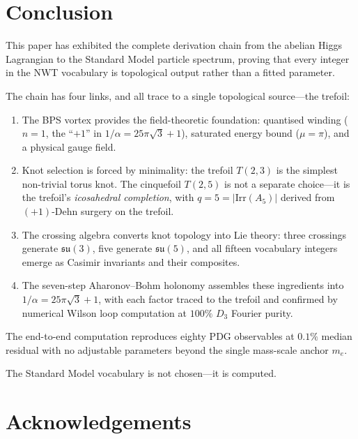 \documentclass[11pt]{article}
\newcommand{\su}{\mathfrak{su}}
\begin{document}
\section{Conclusion}
\label{sec:conclusion}

This paper has exhibited the complete derivation chain from the
abelian Higgs Lagrangian to the Standard Model particle spectrum,
proving that every integer in the NWT vocabulary is topological
output rather than a fitted parameter.

The chain has four links, and all trace to a single topological
source---the trefoil:
\begin{enumerate}\setlength\itemsep{2pt}
  \item The BPS vortex provides the field-theoretic foundation:
    quantised winding ($n = 1$, the ``$+1$'' in
    $1/\alpha = 25\pi\sqrt{3}+1$), saturated energy bound
    ($\mu = \pi$), and a physical gauge field.
  \item Knot selection is forced by minimality: the trefoil
    $T(2,3)$ is the simplest non-trivial torus knot.  The
    cinquefoil $T(2,5)$ is not a separate choice---it is the
    trefoil's \emph{icosahedral completion}, with
    $q = 5 = |\mathrm{Irr}(A_5)|$ derived from $(+1)$-Dehn
    surgery on the trefoil.
  \item The crossing algebra converts knot topology into Lie
    theory: three crossings generate $\su(3)$, five generate
    $\su(5)$, and all fifteen vocabulary integers emerge as
    Casimir invariants and their composites.
  \item The seven-step Aharonov--Bohm holonomy assembles these
    ingredients into $1/\alpha = 25\pi\sqrt{3}+1$, with each
    factor traced to the trefoil and confirmed by numerical
    Wilson loop computation at $100\%$ $D_3$ Fourier purity.
\end{enumerate}

The end-to-end computation reproduces eighty PDG observables at
$0.1\%$ median residual with no adjustable parameters beyond the
single mass-scale anchor $m_e$.

The Standard Model vocabulary is not chosen---it is computed.

\section*{Acknowledgements}
\end{document}
